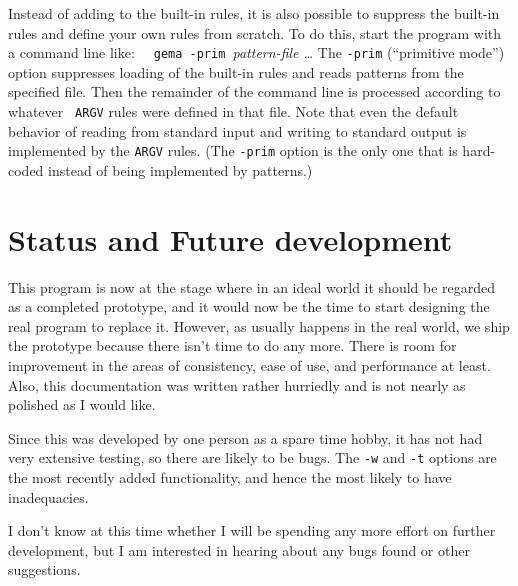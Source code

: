 Instead of adding to the built-in rules, it is also possible to suppress
the built-in rules and define your own rules from scratch.  To do this,
start the program with a command line like:\newline
\verb|  gema -prim |{\em pattern-file  \ldots}
\newline
The \verb/-prim/ (``primitive mode'') option suppresses loading of the
built-in rules and reads patterns from the specified file.  Then the
remainder of the command line is processed according to whatever {\tt
ARGV} rules were defined in that file.
Note that even the default behavior of reading from standard input and
writing to standard output is implemented by the {\tt ARGV} rules.
(The \verb/-prim/ option is the only one that is hard-coded instead of
being implemented by patterns.)

\section{Status and Future development}

This program is now at the stage where in an ideal world it should be
regarded as a completed prototype, and it would now be the time to start
designing the real program to replace it.  However, as usually happens
in the real world, we ship the prototype because there isn't time to do
any more.  There is room for improvement in the areas of consistency,
ease of use, and performance at least.
Also, this documentation was written rather hurriedly and is not nearly as
polished as I would like.

Since this was developed by one person as a spare time hobby, it has not
had very extensive testing, so there are likely to be bugs.  The
\verb/-w/ and \verb/-t/ options are the most recently added
functionality, and hence the most likely to have inadequacies.

I don't know at this time whether I will be spending any more effort on
further development, but I am interested in hearing about any bugs found
or other suggestions.

